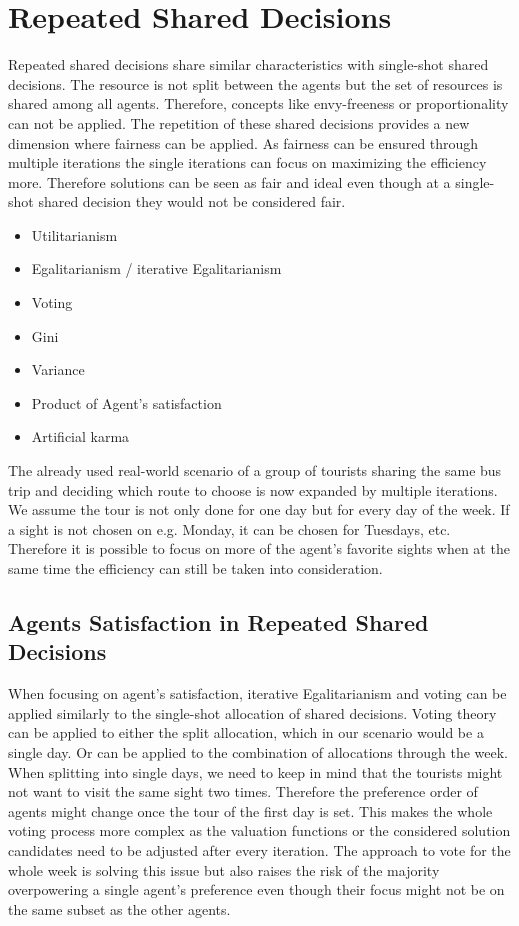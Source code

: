 \documentclass[german, a4paper, 11pt, oneside]{scrbook}
\begin{document}
\section{Repeated Shared Decisions}
Repeated shared decisions share similar characteristics with single-shot shared decisions. The resource is not split between the agents but the set of resources is shared among all agents. Therefore, concepts like envy-freeness or proportionality can not be applied. The repetition of these shared decisions provides a new dimension where fairness can be applied. As fairness can be ensured through multiple iterations the single iterations can focus on maximizing the efficiency more. Therefore solutions can be seen as fair and ideal even though at a single-shot shared decision they would not be considered fair. 
\begin{itemize}
  \item Utilitarianism
  \item Egalitarianism / iterative Egalitarianism
  \item Voting
\item Gini 
\item Variance
\item Product of Agent's satisfaction
\item Artificial karma
\end{itemize}
The already used real-world scenario of a group of tourists sharing the same bus trip and deciding which route to choose is now expanded by multiple iterations. We assume the tour is not only done for one day but for every day of the week. If a sight is not chosen on e.g. Monday, it can be chosen for Tuesdays, etc. Therefore it is possible to focus on more of the agent's favorite sights when at the same time the efficiency can still be taken into consideration.
\subsection{Agents Satisfaction in Repeated Shared Decisions}
When focusing on agent's satisfaction, iterative Egalitarianism and voting can be applied similarly to the single-shot allocation of shared decisions. Voting theory can be applied to either the split allocation, which in our scenario would be a single day. Or can be applied to the combination of allocations through the week. When splitting into single days, we need to keep in mind that the tourists might not want to visit the same sight two times. Therefore the preference order of agents might change once the tour of the first day is set. This makes the whole voting process more complex as the valuation functions or the considered solution candidates need to be adjusted after every iteration. The approach to vote for the whole week is solving this issue but also raises the risk of the majority overpowering a single agent's preference even though their focus might not be on the same subset as the other agents.
\end{document}
